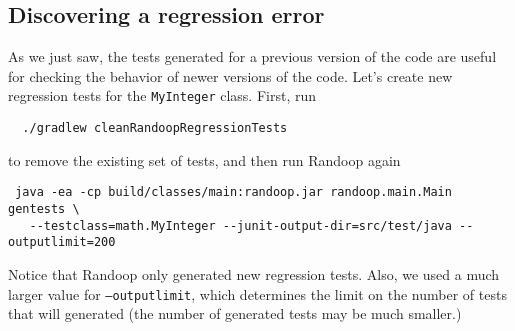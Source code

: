\documentclass[11pt, oneside]{article} %
\newcommand{\code}[1]{{\texttt{#1}}}
\newcommand{\cmd}[1]{{\texttt{#1}}}
\begin{document}
\subsection{Discovering a regression error}

As we just saw, the tests generated for a previous version of the code are useful for checking the behavior of newer versions of the code.
Let's create new regression tests for the \code{MyInteger} class.
First, run
\begin{verbatim}
  ./gradlew cleanRandoopRegressionTests
\end{verbatim}
to remove the existing set of tests, and then run Randoop again
\begin{verbatim}
 java -ea -cp build/classes/main:randoop.jar randoop.main.Main gentests \
   --testclass=math.MyInteger --junit-output-dir=src/test/java --outputlimit=200
\end{verbatim}
Notice that Randoop only generated new regression tests.
Also, we used a much larger value for \cmd{--outputlimit}, which determines the limit on the number of tests that will generated (the number of generated tests may be much smaller.)
\end{document}
